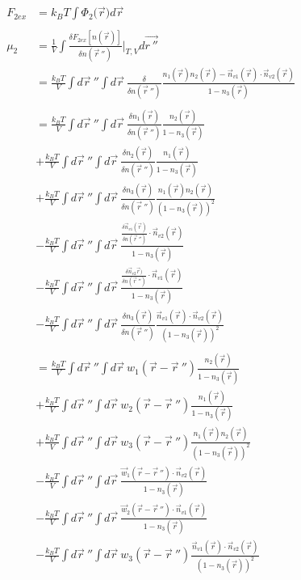 \documentclass[double,12pt]{beavtex}
\begin{document}
\begin{align}
    F_{2ex} &= k_BT\int \Phi_2(\vec{r}{) d}\vec{r} \\ \nonumber\\
    \mu_2 &= \frac{1}{V}\int \frac{\delta F_{2ex}[n(\vec r)]}{\delta n(\vec r~'')}
          \bigg|_{T,V} d\vec{r~''} \\
%
          &= \frac{k_BT}{V} \int d\vec r~'' \int d \vec r ~
          \frac{\delta }{\delta n(\vec r~'')}
          \frac{n_1(\vec r)n_2(\vec r)-\vec n_{v1}(\vec r)\cdot 
          \vec n_{v2}(\vec r)}{1-n_3(\vec r)}   \nonumber\\  \\        
%
          &= \frac{k_BT}{V} \int d\vec r~'' \int d \vec r ~
          \frac{\delta n_1(\vec r)}{\delta n(\vec r~'')}
          \frac{n_2(\vec r)}{1-n_3(\vec r)}   \nonumber\\
          &+\frac{k_BT}{V} \int d\vec r~'' \int d \vec r ~
          \frac{\delta n_2(\vec r)}{\delta n(\vec r~'')}
          \frac{n_1(\vec r)}{1-n_3(\vec r)}   \nonumber\\
          &+\frac{k_BT}{V} \int d\vec r~'' \int d \vec r~
          \frac{\delta n_3(\vec r)}{\delta n(\vec r~'')}
          \frac{n_1(\vec r)n_2(\vec r)}{(1-n_3(\vec r))^2}  \nonumber\\
          &-\frac{k_BT}{V} \int d\vec r~'' \int d \vec r~\frac{\frac{\delta 
          \vec n_{v1}(\vec r)}{\delta n(\vec r~'')}\cdot \vec n_{v2}(\vec r)}
          {1-n_3(\vec r)}  \nonumber\\
          &-\frac{k_BT}{V} \int d\vec r~'' \int d \vec r~\frac{\frac{\delta 
          \vec n_{v2}\vec r)}{\delta n(\vec r~'')}\cdot \vec n_{v1}(\vec r)}
          {1-n_3(\vec r)}  \nonumber\\
          &-\frac{k_BT}{V} \int d\vec r~''\int d \vec r ~
          \frac{\delta n_3(\vec r)}{\delta n(\vec r~'')}
           \frac{\vec n_{v1}(\vec r)\cdot \vec n_{v2}(\vec r)}
           {(1-n_3(\vec r))^2} \\ \nonumber\\
%
          &= \frac{k_BT}{V} \int d\vec r~'' \int d \vec r ~w_1(\vec r-\vec r~'')
          \frac{n_2(\vec r)}{1-n_3(\vec r)}   \nonumber\\
          &+\frac{k_BT}{V} \int d\vec r~'' \int d \vec r ~w_2(\vec r-\vec r~'')
          \frac{n_1(\vec r)}{1-n_3(\vec r)}   \nonumber\\
          &+\frac{k_BT}{V} \int d\vec r~'' \int d \vec r~w_3(\vec r - \vec r~'') 
          \frac{n_1(\vec r)n_2(\vec r)}{(1-n_3(\vec r))^2}  \nonumber\\
          &-\frac{k_BT}{V} \int d\vec r~'' \int d \vec r~\frac{\vec w_1(\vec r 
          - \vec r~'')\cdot \vec n_{v2}(\vec r)}{1-n_3(\vec r)}  \nonumber\\
          &-\frac{k_BT}{V} \int d\vec r~'' \int d \vec r~\frac{\vec w_2(\vec r 
          - \vec r~'')\cdot \vec n_{v1}(\vec r)}{1-n_3(\vec r)}  \nonumber\\
          &-\frac{k_BT}{V} \int d\vec r~''\int d \vec r ~w_3(\vec r - \vec r~'')
           \frac{\vec n_{v1}(\vec r)\cdot \vec n_{v2}(\vec r)}
           {(1-n_3(\vec r))^2} 
\end{align}
\end{document}
